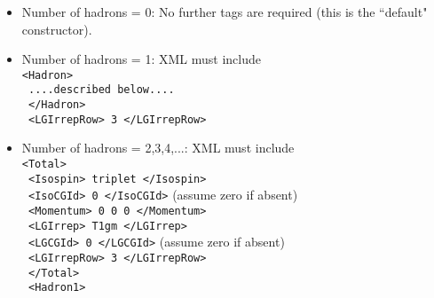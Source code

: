 \documentclass[12pt]{article}
\begin{document}
\begin{itemize}
\item                                               
Number of hadrons = 0:                                                              
  No further tags are required                                
     (this is the ``default" constructor).                     
\item                                        
Number of hadrons = 1: XML must include\\
\texttt{<Hadron>}\\                                              
\hspace*{15pt}\texttt{      ....described below.... }\\                                  
\texttt{   </Hadron>  }\\                                                  
\texttt{   <LGIrrepRow> 3 </LGIrrepRow> }                             
\item                                                                
Number of hadrons = 2,3,4,...:  XML must include\\                              
\texttt{<Total>}\\                                                      
\hspace*{15pt}\texttt{       <Isospin> triplet </Isospin> }\\                            
\hspace*{15pt}\texttt{       <IsoCGId> 0 </IsoCGId>} \hspace*{30pt}  (assume zero if absent) \\          
\hspace*{15pt}\texttt{       <Momentum>  0 0 0  </Momentum>}\\                           
\hspace*{15pt}\texttt{       <LGIrrep> T1gm </LGIrrep>}\\                                
\hspace*{15pt}\texttt{       <LGCGId> 0 </LGCGId>}  \hspace*{43pt}   (assume zero if absent)  \\           
\hspace*{15pt}\texttt{       <LGIrrepRow> 3 </LGIrrepRow>}\\                             
\texttt{   </Total> }\\                                                    
\texttt{   <Hadron1> }\\                                                   

\end{itemize}
\end{document}
